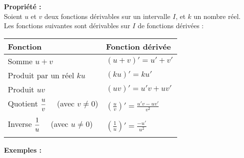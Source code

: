 \documentclass[11pt,a4paper]{article}
\begin{document}
\begin{mdframed}[style=proprieteStyle]
    \textbf{Propriété :} ~\\
    Soient $u$ et $v$ deux fonctions dérivables sur un intervalle $I$, et $k$ un nombre réel. \\
    Les fonctions suivantes sont dérivables sur $I$ de fonctions dérivées : \\

    \renewcommand{\arraystretch}{2}
    \begin{tabularx}{\linewidth}{|Y|Y|}
        \hline
        \textbf{Fonction}                     & \textbf{Fonction dérivée}                                      \\
        \hline
        Somme $u+v$                           & $(u+v)'=u'+v'$                                                 \\
        \hline
        Produit par un réel $ku$              & $(ku)'=ku'$                                                    \\
        \hline
        Produit $uv$                          & $(uv)'=u'v+uv'$                                                \\
        \hline
        Quotient $\displaystyle\frac{u}{v}\color{white}\frac{-}{\frac{-}{-}}$ (avec $v\not=0$)& $\displaystyle{}\left(\frac{u}{v}\right)'=\frac{u'v-uv'}{v^2}$ \\
        \hline
        Inverse $\displaystyle\frac{1}{u}\color{white}\frac{-}{\frac{-}{-}}$ (avec $u\not=0$)& $\displaystyle\left(\frac{1}{u}\right)'=\frac{-u'}{u^2}$ \\
        \hline
    \end{tabularx}
\end{mdframed}

\textbf{Exemples :}
\end{document}
